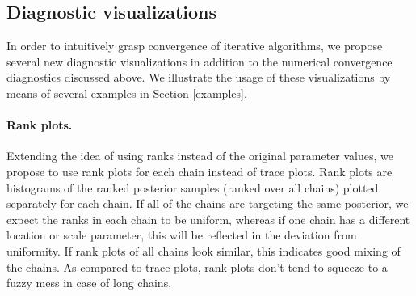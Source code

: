 \documentclass[american,]{article}
\providecommand{\tightlist}{%
  \setlength{\itemsep}{0pt}\setlength{\parskip}{0pt}}
\let\oldparagraph\paragraph
\renewcommand{\paragraph}[1]{\oldparagraph{#1}\mbox{}}
\theoremstyle{definition}
\begin{document}




\hypertarget{diagnostic-visualizations}{%
\subsection{Diagnostic visualizations}\label{diagnostic-visualizations}}

In order to intuitively grasp convergence of iterative algorithms, we
propose several new diagnostic visualizations in addition to the numerical
convergence diagnostics discussed above. We illustrate the usage of
these visualizations by means of several examples in Section
\ref{examples}.

\hypertarget{rank-plots}{%
\paragraph{Rank plots.}\label{rank-plots}}
Extending the idea of using ranks instead of the original parameter
values, we propose to use rank plots for each chain instead
of trace plots. Rank plots are histograms of the
ranked posterior samples (ranked over all chains) plotted separately for
each chain. If all of the chains are targeting the same posterior, we expect the 
ranks in each chain to be uniform, whereas if one chain has a different location
or scale parameter, this will be reflected in the deviation from uniformity. 
 If rank plots of all chains look similar, this indicates
good mixing of the chains. As compared to trace plots, rank plots don't
tend to squeeze to a fuzzy mess in case of long chains.
\end{document}

